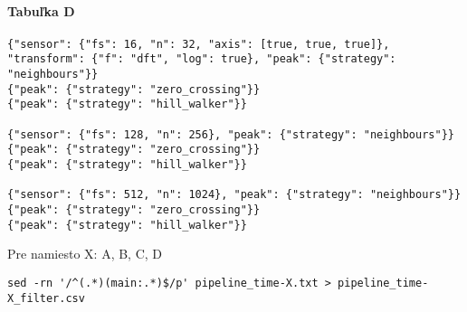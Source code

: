 \paragraph{Tabuľka D}

\begin{lstlisting}[style=messages]
{"sensor": {"fs": 16, "n": 32, "axis": [true, true, true]}, "transform": {"f": "dft", "log": true}, "peak": {"strategy": "neighbours"}}
{"peak": {"strategy": "zero_crossing"}}
{"peak": {"strategy": "hill_walker"}}

{"sensor": {"fs": 128, "n": 256}, "peak": {"strategy": "neighbours"}}
{"peak": {"strategy": "zero_crossing"}}
{"peak": {"strategy": "hill_walker"}}

{"sensor": {"fs": 512, "n": 1024}, "peak": {"strategy": "neighbours"}}
{"peak": {"strategy": "zero_crossing"}}
{"peak": {"strategy": "hill_walker"}}
\end{lstlisting}

Pre namiesto X: A, B, C, D

\begin{lstlisting}[style=messages]
sed -rn '/^(.*)(main:.*)$/p' pipeline_time-X.txt > pipeline_time-X_filter.csv
\end{lstlisting}



